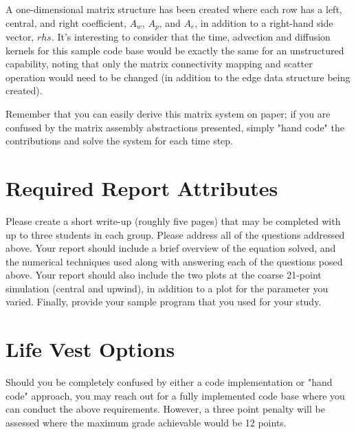 \documentclass{article}
\begin{document}
A one-dimensional matrix structure has been created where each row has a left, central, and right coefficient, $A_w$, $A_p$, and $A_e$, in addition to a right-hand side vector, $rhs$. It's interesting to consider that the time, advection and diffusion kernels for this sample code base would be exactly the same for an unstructured capability, noting that only the matrix connectivity mapping and scatter operation would need to be changed (in addition to the edge data structure being created). 

Remember that you can easily derive this matrix system on paper; if you are confused by the matrix assembly abstractions presented, simply "hand code" the contributions and solve the system for each time step.

\section{Required Report Attributes}
Please create a short write-up (roughly five pages) that may be completed with up to three students in each group. Please address all of the questions addressed above. Your report should include a brief overview of the equation solved, and the numerical
techniques used along with answering each of the questions posed above. Your report should also include the two plots at
the coarse 21-point simulation (central and upwind), in addition to a plot for the parameter you varied. Finally, provide your sample program that you used for your study. 

\section{Life Vest Options}
Should you be completely confused by either a code implementation or "hand code" approach, you may reach out for a fully implemented code base where you can conduct the above requirements. However, a three point penalty will be assessed where the maximum grade achievable would be 12 points.
\end{document}

